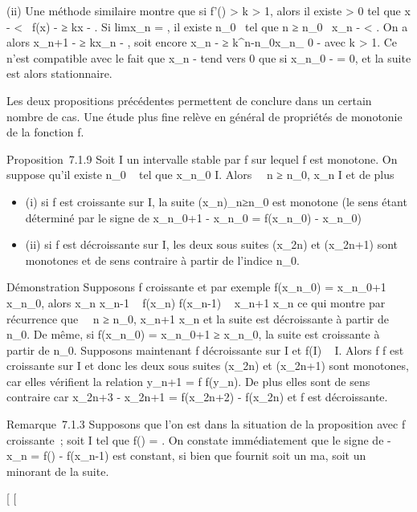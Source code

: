 \documentclass[]{article}
\begin{document}
(ii) Une méthode similaire montre que si \textbar{}f'(\ell)\textbar{}
\textgreater{} k \textgreater{} 1, alors il existe \eta \textgreater{} 0
tel que \textbar{}x - \ell\textbar{} \textless{} \eta \rigtharrow~\textbar{}f(x) -
\ell\textbar{}≥ k\textbar{}x - \ell\textbar{}. Si
limx\_n = \ell, il existe n\_0~
tel que n ≥ n\_0 \rigtharrow~\textbar{}x\_n - \ell\textbar{}
\textless{} \eta. On a alors \textbar{}x\_n+1 - \ell\textbar{}≥
k\textbar{}x\_n - \ell\textbar{}, soit encore
\textbar{}x\_n - \ell\textbar{}≥
k^n-n\_0\textbar{}x\_n\_ 0 -
\ell\textbar{} avec k \textgreater{} 1. Ce n'est compatible avec le fait
que x\_n - \ell tend vers 0 que si x\_n\_0 - \ell = 0,
et la suite est alors stationnaire.

Les deux propositions précédentes permettent de conclure dans un certain
nombre de cas. Une étude plus fine relève en général de propriétés de
monotonie de la fonction f.

Proposition~7.1.9 Soit I un intervalle stable par f sur lequel f est
monotone. On suppose qu'il existe n\_0 \in {}~ tel que
x\_n\_0 \in I. Alors \forall~~n ≥
n\_0, x\_n \in I et de plus

\begin{itemize}
\itemsep1pt\parskip0pt
\item
  (i) si f est croissante sur I, la suite
  (x\_n)\_n≥n\_0 est monotone (le sens étant
  déterminé par le signe de x\_n\_0+1 -
  x\_n\_0 = f(x\_n\_0) -
  x\_n\_0)
\item
  (ii) si f est décroissante sur I, les deux sous suites (x\_2n)
  et (x\_2n+1) sont monotones et de sens contraire à partir de
  l'indice n\_0.
\end{itemize}

Démonstration Supposons f croissante et par exemple
f(x\_n\_0) = x\_n\_0+1 \leq
x\_n\_0, alors x\_n \leq x\_n-1 \rigtharrow~
f(x\_n) \leq f(x\_n-1) \rigtharrow~ x\_n+1 \leq x\_n ce
qui montre par récurrence que \forall~~n ≥
n\_0, x\_n+1 \leq x\_n et la suite est décroissante
à partir de n\_0. De même, si f(x\_n\_0) =
x\_n\_0+1 ≥ x\_n\_0, la suite est
croissante à partir de n\_0. Supposons maintenant f décroissante
sur I et f(I) \subset~ I. Alors f \cdot f est croissante sur I et donc les deux
sous suites (x\_2n) et (x\_2n+1) sont monotones, car
elles vérifient la relation y\_n+1 = f \cdot f(y\_n). De
plus elles sont de sens contraire car x\_2n+3 - x\_2n+1
= f(x\_2n+2) - f(x\_2n) et f est décroissante.

Remarque~7.1.3 Supposons que l'on est dans la situation de la
proposition avec f croissante~; soit \ell \in I tel que f(\ell) = \ell. On constate
immédiatement que le signe de \ell - x\_n = f(\ell) -
f(x\_n-1) est constant, si bien que \ell fournit soit un ma\jmathorant,
soit un minorant de la suite.

{[}
{[}
\end{document}
